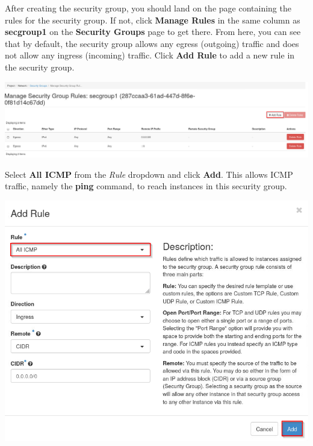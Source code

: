 \documentclass[letterpaper, 12pt]{article}
\begin{document}
\begin{enumerate}
    \begin{labstep}
        After creating the security group, you should land on the page containing the rules for the security group.
        If not, click \textbf{Manage Rules} in the same column as \textbf{secgroup1} on the \textbf{Security Groups} page to get there.
        From here, you can see that by default, the security group allows any egress (outgoing) traffic and does not allow any ingress (incoming) traffic.
        Click \textbf{Add Rule} to add a new rule in the security group.

        \begin{center}
            \includegraphics[width=\linewidth]{images/part5/step4.png}
        \end{center}
    \end{labstep}

    \begin{labstep}
        Select \textbf{All ICMP} from the \textit{Rule} dropdown and click \textbf{Add}.
        This allows ICMP traffic, namely the \textbf{ping} command, to reach instances in this security group.

        \begin{center}
            \includegraphics[width=\linewidth]{images/part5/step5.png}
        \end{center}
    \end{labstep}


\end{enumerate}
\end{document}
